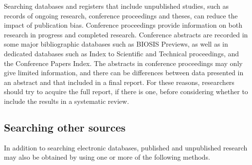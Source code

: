 \documentclass[
  10pt,
  a4paper,
  DIV=11,
  numbers=noendperiod]{scrreprt}
\begin{document}
Searching databases and registers that include unpublished studies, such
as records of ongoing research, conference proceedings and theses, can
reduce the impact of publication bias. Conference proceedings provide
information on both research in progress and completed research.
Conference abstracts are recorded in some major bibliographic databases
such as BIOSIS Previews, as well as in dedicated databases such as Index
to Scientific and Technical proceedings, and the Conference Papers
Index. The abstracts in conference proceedings may only give limited
information, and there can be differences between data presented in an
abstract and that included in a final report. For these reasons,
researchers should try to acquire the full report, if there is one,
before considering whether to include the results in a systematic
review.

\subsection{Searching other sources}\label{searching-other-sources}

In addition to searching electronic databases, published and unpublished
research may also be obtained by using one or more of the following
methods.
\end{document}
